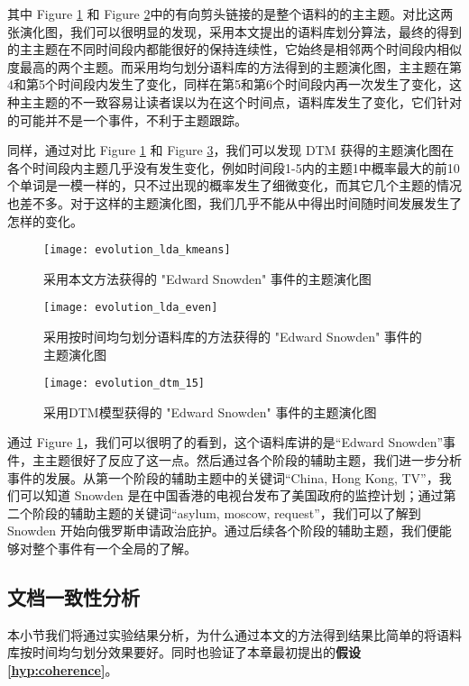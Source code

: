 其中 Figure \ref{fig:evolution-our} 和 Figure \ref{fig:evolution-even}中的有向剪头链接的是整个语料的的主主题。对比这两张演化图，我们可以很明显的发现，采用本文提出的语料库划分算法，最终的得到的主主题在不同时间段内都能很好的保持连续性，它始终是相邻两个时间段内相似度最高的两个主题。而采用均匀划分语料库的方法得到的主题演化图，主主题在第4和第5个时间段内发生了变化，同样在第5和第6个时间段内再一次发生了变化，这种主主题的不一致容易让读者误以为在这个时间点，语料库发生了变化，它们针对的可能并不是一个事件，不利于主题跟踪。

同样，通过对比 Figure \ref{fig:evolution-our} 和 Figure \ref{fig:evolution-dtm}，我们可以发现 DTM 获得的主题演化图在各个时间段内主题几乎没有发生变化，例如时间段1-5内的主题1中概率最大的前10个单词是一模一样的，只不过出现的概率发生了细微变化，而其它几个主题的情况也差不多。对于这样的主题演化图，我们几乎不能从中得出时间随时间发展发生了怎样的变化。

\begin{figure}[htb]
	\centering
	\texttt{[image: evolution\_lda\_kmeans]}
	\caption{采用本文方法获得的 "Edward Snowden" 事件的主题演化图}
	\label{fig:evolution-our}
\end{figure}
\begin{figure}[ht]
	\centering
	\texttt{[image: evolution\_lda\_even]}
	\caption{采用按时间均匀划分语料库的方法获得的 "Edward Snowden" 事件的主题演化图}
	\label{fig:evolution-even}
\end{figure}
\begin{figure}[hb]
	\centering
	\texttt{[image: evolution\_dtm\_15]}
	\caption{采用DTM模型获得的 "Edward Snowden" 事件的主题演化图}
	\label{fig:evolution-dtm}
\end{figure}

通过 Figure \ref{fig:evolution-our}，我们可以很明了的看到，这个语料库讲的是“Edward Snowden”事件，主主题很好了反应了这一点。然后通过各个阶段的辅助主题，我们进一步分析事件的发展。从第一个阶段的辅助主题中的关键词“China, Hong Kong, TV”，我们可以知道 Snowden 是在中国香港的电视台发布了美国政府的监控计划；通过第二个阶段的辅助主题的关键词“asylum, moscow, request”，我们可以了解到 Snowden 开始向俄罗斯申请政治庇护。通过后续各个阶段的辅助主题，我们便能够对整个事件有一个全局的了解。

\subsection{文档一致性分析}
\label{sec:coherence-result}
本小节我们将通过实验结果分析，为什么通过本文的方法得到结果比简单的将语料库按时间均匀划分效果要好。同时也验证了本章最初提出的\textbf{假设 \ref{hyp:coherence}}。

